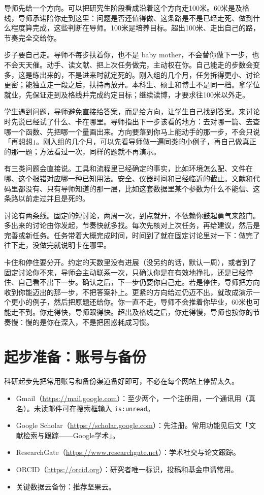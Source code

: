 导师先给一个方向。可以把研究生阶段看成沿着这个方向走100米。60米是及格线，导师承诺陪你走到这里：问题是否还值得做、这条路是不是已经走死、做到什么程度算完成，这些判断在导师。100米是培养目标。超出100米、走出自己的路，节奏完全交给你。

步子要自己走。导师不每步扶着你，也不是 baby mother，不会替你做下一步，也不会天天催。动手、读文献、把上次任务做完，主动权在你。自己能走的步数会变多，这是练出来的，不是进来时就定死的。刚入组的几个月，任务拆得更小、讨论更密；能独立走一段之后，扶持再放开。本科生、硕士和博士不是同一档。拿学位就业，先保证走到及格线并完成约定目标；继续读博，才要求往100米以外走。

学生遇到问题，导师避免直接给答案，而是给方向，让学生自己找到答案。来讨论时先说已经试了什么、卡在哪里。导师指出下一步该看的地方：去对哪一篇、去查哪一个函数、先把哪一个量画出来。方向要落到你马上能动手的那一步，不会只说「再想想」。刚入组的几个月，可以先看导师做一遍同类的小例子，再自己做真正的那一题；方法看过一次，同样的题就不再演示。

有三类问题会直接说。工具和流程里已经确定的事实，比如环境怎么配、文件在哪、这个报错对应哪一种已知用法。安全、仪器时间和已经临近的截止。文献和代码里都没有、只有导师知道的那一层，比如这套数据里某个参数为什么不能信、这条路以前走过并且是死的。

讨论有两条线。固定的短讨论，两周一次，到点就开，不依赖你鼓起勇气来敲门。多出来的讨论由你发起，节奏快就多找。每次先核对上次任务，再给建议，然后是完善或新任务。任务带着大概完成时间，时间到了就在固定讨论里对一下：做完了往下走，没做完就说明卡在哪里。

卡住和停住要分开。约定的天数里没有进展（没另约的话，默认一周），或者到了固定讨论你不来，导师会主动联系一次，只确认你是在有效地挣扎，还是已经停住、自己看不出下一步。确认之后，下一步仍要你自己走。若是停住，导师把方向收到你能迈出的那一步，不把答案补上。更紧的方向给过仍迈不出，就改成演示一个更小的例子，然后把原题还给你。你一直不走，导师不会推着你毕业，60米也可能走不到。你走得快，导师跟得快。超出及格线之后，你走得慢，导师也按你的节奏慢：慢的是你在深入，不是把困惑耗成习惯。




\section{起步准备：账号与备份}
科研起步先把常用账号和备份渠道备好即可，不必在每个网站上停留太久。

\begin{itemize}
\item Gmail（\url{https://mail.google.com}）：至少两个，一个注册用，一个通讯用（真名）。未读邮件可在搜索框输入 \verb|is:unread|。
\item Google Scholar（\url{https://scholar.google.com}）：先注册。常用功能见后文「文献检索与跟踪——Google学术」。
\item ResearchGate（\url{https://www.researchgate.net}）：学术社交与论文跟踪。
\item ORCID（\url{https://orcid.org}）：研究者唯一标识，投稿和基金申请常用。
\item 关键数据云备份：推荐坚果云。
\end{itemize}



